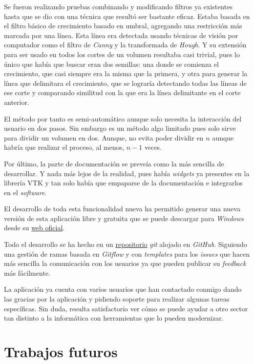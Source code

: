 Se fueron realizando pruebas combinando y modificando filtros ya existentes hasta que se dio con una técnica que resultó ser bastante eficaz. Estaba basada en el filtro básico de crecimiento basado en umbral, agregando una restricción más marcada por una línea. Esta línea era detectada usando técnicas de visión por computador como el filtro de \textit{Canny} y la transformada de \textit{Hough}. Y su extensión para ser usado en todos los cortes de un volumen resultaba casi trivial, pues lo único que había que buscar eran dos semillas: una donde se comienza el crecimiento, que casi siempre era la misma que la primera, y otra para generar la línea que delimitara el crecimiento, que se lograría detectando todas las líneas de ese corte y comparando similitud con la que era la línea delimitante en el corte anterior.

El método por tanto es semi-automático aunque solo necesita la interacción del usuario en dos pasos. Sin embargo es un método algo limitado pues solo sirve para dividir un volumen en dos. Aunque, no evita poder dividir en $n$ aunque habría que realizar el proceso, al menos, $n-1$ veces.

Por último, la parte de documentación se preveía como la más sencilla de desarrollar. Y nada más lejos de la realidad, pues había \textit{widgets} ya presentes en la librería VTK y tan solo había que empaparse de la documentación e integrarlos en el \textit{software}.

El desarrollo de toda esta funcionalidad nueva ha permitido generar una nueva versión de esta aplicación libre y gratuita que se puede descargar para \textit{Windows} desde su \href{https://fblupi.github.io/3DCurator/es/}{web oficial}.

Todo el desarrollo se ha hecho en un \href{https://github.com/fblupi/3DCurator}{repositorio} \textit{git} alojado en \textit{GitHub}. Siguiendo una gestión de ramas basada en \textit{Gitflow} y con \textit{templates} para los \textit{issues} que hacen más sencilla la comunicación con los usuarios ya que pueden publicar su \textit{feedback} más fácilmente.

La aplicación ya cuenta con varios usuarios que han contactado conmigo dando las gracias por la aplicación y pidiendo soporte para realizar algunas tareas específicas. Sin duda, resulta satisfactorio ver cómo se puede ayudar a otro sector tan distinto a la informática con herramientas que lo pueden modernizar.

\section{Trabajos futuros}

